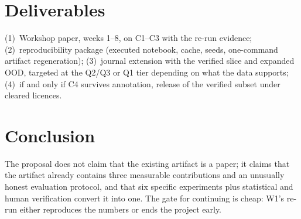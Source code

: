 \documentclass[11pt]{article}
\begin{document}
\section{Deliverables}
(1)~Workshop paper, weeks 1--8, on C1--C3 with the re-run evidence;
(2)~reproducibility package (executed notebook, cache, seeds, one-command
artifact regeneration); (3)~journal extension with the verified slice and
expanded OOD, targeted at the Q2/Q3 or Q1 tier depending on what the data
supports; (4)~if and only if C4 survives annotation, release of the verified
subset under cleared licences.

\section{Conclusion}
The proposal does not claim that the existing artifact is a paper; it claims
that the artifact already contains three measurable contributions and an
unusually honest evaluation protocol, and that six specific experiments plus
statistical and human verification convert it into one. The gate for
continuing is cheap: W1's re-run either reproduces the numbers or ends the
project early.



\end{document}
